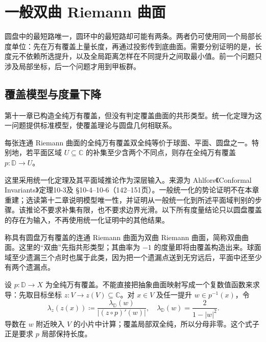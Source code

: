 \section{一般双曲 Riemann 曲面}
\label{b3:sec:1304}

圆盘中的最短路唯一，圆环中的最短路却可能有两条。两者仍可使用同一个局部长度单位：先在万有覆盖上量长度，再通过投影传到底曲面。需要分别证明的是，长度元不依赖所选提升，以及全局距离怎样在不同提升之间取最小值。前一个问题只涉及局部坐标，后一个问题才用到甲板群。

\subsection{覆盖模型与度量下降}
\label{b3:subsec:130401}

第十一章已构造全纯万有覆盖，但没有判定覆盖曲面的共形类型。统一化定理为这一问题提供标准模型，使覆盖理论与圆盘几何相联系。

\begin{theorem}[深层覆盖模型输入]\label{b3:thm:13-cover-model-input}
每张连通 Riemann 曲面的全纯万有覆盖双全纯等价于球面、平面、圆盘之一。特别地，若平面区域 \(U\subseteq\mathbb C\) 的补集至少含两个不同点，则存在全纯万有覆盖 \(p:\mathbb D\to U\)。
\end{theorem}
\begin{proofsketch}
这里采用统一化定理及其平面域推论作为深层输入。来源为 Ahlfors《Conformal Invariants》\cite{Ahlfors2010Conformal}定理10-3及 \S10-4--10-6（142--151页）。一般统一化的势论证明不在本章重建；选读第十二章说明模型唯一性，并证明从一般统一化到所述平面域判别的步骤。该推论不要求补集有限，也不要求边界光滑。以下所有度量结论只以圆盘覆盖的存在为输入，不再使用统一化证明中的其他结果。
\end{proofsketch}

称具有圆盘万有覆盖的连通 Riemann 曲面为双曲 Riemann 曲面，简称双曲曲面。这里的“双曲”先指共形类型；其曲率为 \(-1\) 的度量即将由覆盖构造出来。球面域至少遗漏三个点时也属于此类，因为把一个遗漏点送到无穷远后，平面中还至少有两个遗漏点。

\ProseParagraphBreak
设 \(p:\mathbb D\to X\) 为全纯万有覆盖。不能直接把抽象曲面映射写成一个复数值函数来求导：先取目标坐标 \(z:V\to z(V)\subseteq\mathbb C\)。对 \(x\in V\) 及任一提升 \(w\in p^{-1}(x)\)，令
\[
 \lambda_z(z(x))\coloneqq
 \frac{\lambda_{\mathbb D}(w)}{|(z\circ p)'(w)|},
 \quad \lambda_{\mathbb D}(w)=\frac2{1-|w|^2}.
\]
导数在 \(w\) 附近映入 \(V\) 的小片中计算；覆盖局部双全纯，所以分母非零。这个式子正是要求 \(p\) 局部保持长度。

